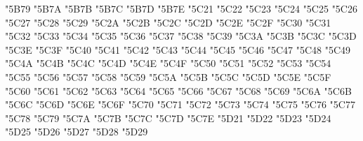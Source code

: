 {\Uchar\jis"5B79 %
\Uchar\jis"5B7A %
\Uchar\jis"5B7B %
\Uchar\jis"5B7C %
\Uchar\jis"5B7D %
\Uchar\jis"5B7E %
\Uchar\jis"5C21 %
\Uchar\jis"5C22 %
\Uchar\jis"5C23 %
\Uchar\jis"5C24 %
\Uchar\jis"5C25 %
\Uchar\jis"5C26 %
\Uchar\jis"5C27 %
\Uchar\jis"5C28 %
\Uchar\jis"5C29 %
\Uchar\jis"5C2A %
\Uchar\jis"5C2B %
\Uchar\jis"5C2C %
\Uchar\jis"5C2D %
\Uchar\jis"5C2E %
\Uchar\jis"5C2F %
\Uchar\jis"5C30 %
\Uchar\jis"5C31 %
\Uchar\jis"5C32 %
\Uchar\jis"5C33 %
\Uchar\jis"5C34 %
\Uchar\jis"5C35 %
\Uchar\jis"5C36 %
\Uchar\jis"5C37 %
\Uchar\jis"5C38 %
\Uchar\jis"5C39 %
\Uchar\jis"5C3A %
\Uchar\jis"5C3B %
\Uchar\jis"5C3C %
\Uchar\jis"5C3D %
\Uchar\jis"5C3E %
\Uchar\jis"5C3F %
\Uchar\jis"5C40 %
\Uchar\jis"5C41 %
\Uchar\jis"5C42 %
\Uchar\jis"5C43 %
\Uchar\jis"5C44 %
\Uchar\jis"5C45 %
\Uchar\jis"5C46 %
\Uchar\jis"5C47 %
\Uchar\jis"5C48 %
\Uchar\jis"5C49 %
\Uchar\jis"5C4A %
\Uchar\jis"5C4B %
\Uchar\jis"5C4C %
\Uchar\jis"5C4D %
\Uchar\jis"5C4E %
\Uchar\jis"5C4F %
\Uchar\jis"5C50 %
\Uchar\jis"5C51 %
\Uchar\jis"5C52 %
\Uchar\jis"5C53 %
\Uchar\jis"5C54 %
\Uchar\jis"5C55 %
\Uchar\jis"5C56 %
\Uchar\jis"5C57 %
\Uchar\jis"5C58 %
\Uchar\jis"5C59 %
\Uchar\jis"5C5A %
\Uchar\jis"5C5B %
\Uchar\jis"5C5C %
\Uchar\jis"5C5D %
\Uchar\jis"5C5E %
\Uchar\jis"5C5F %
\Uchar\jis"5C60 %
\Uchar\jis"5C61 %
\Uchar\jis"5C62 %
\Uchar\jis"5C63 %
\Uchar\jis"5C64 %
\Uchar\jis"5C65 %
\Uchar\jis"5C66 %
\Uchar\jis"5C67 %
\Uchar\jis"5C68 %
\Uchar\jis"5C69 %
\Uchar\jis"5C6A %
\Uchar\jis"5C6B %
\Uchar\jis"5C6C %
\Uchar\jis"5C6D %
\Uchar\jis"5C6E %
\Uchar\jis"5C6F %
\Uchar\jis"5C70 %
\Uchar\jis"5C71 %
\Uchar\jis"5C72 %
\Uchar\jis"5C73 %
\Uchar\jis"5C74 %
\Uchar\jis"5C75 %
\Uchar\jis"5C76 %
\Uchar\jis"5C77 %
\Uchar\jis"5C78 %
\Uchar\jis"5C79 %
\Uchar\jis"5C7A %
\Uchar\jis"5C7B %
\Uchar\jis"5C7C %
\Uchar\jis"5C7D %
\Uchar\jis"5C7E %
\Uchar\jis"5D21 %
\Uchar\jis"5D22 %
\Uchar\jis"5D23 %
\Uchar\jis"5D24 %
\Uchar\jis"5D25 %
\Uchar\jis"5D26 %
\Uchar\jis"5D27 %
\Uchar\jis"5D28 %
\Uchar\jis"5D29 %
}
